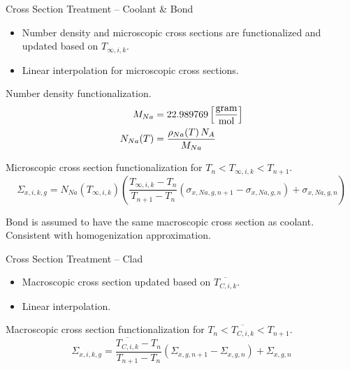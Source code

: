 \begin{frame}{Cross Section Treatment -- Coolant \& Bond}
  \begin{itemize}
    \item Number density and microscopic cross sections are functionalized 
      and updated based on $T_{\infty,i,k}$.
    \item Linear interpolation for microscopic cross sections.
  \end{itemize}

  Number density functionalization.
  \begin{align}
    \label{eq:number_density_sodium}
    M_{Na} &= 22.989769 \left[\text{{$\frac{\text{gram}}{\text{mol}}$}}\right] \\
    N_{Na}(T) &= \frac{\rho_{Na}(T) \, N_A}{M_{Na}}
  \end{align}

  Microscopic cross section functionalization for ${T_{n} < T_{\infty,i,k} <
  T_{n+1}}$.
  \begin{equation}
    \label{eq:xs_cool}
    \Sigma_{x,i,k,g} = N_{Na}(T_{\infty,i,k}) 
      \left( \frac{T_{\infty,i,k} - T_{n}}{T_{n+1}-T_{n}} 
      (\sigma_{x,Na,g,n+1} - \sigma_{x,Na,g,n})  + \sigma_{x,Na,g,n}\right)
  \end{equation}

  Bond is assumed to have the same macroscopic cross section as coolant.\\
  Consistent with homogenization approximation.
\end{frame}

\begin{frame}{Cross Section Treatment -- Clad}
  \begin{itemize}
    \item Macroscopic cross section updated based on $\overline{T_{C,i,k}}$.
    \item Linear interpolation.
  \end{itemize}

  Macroscopic cross section functionalization for ${T_n < \overline{T_{C,i,k}} <
  T_{n+1}}$.
  \begin{equation}
    \label{eq:xs_linear_interpolation}
    \Sigma_{x,i,k,g} = 
      \frac{\overline{T_{C,i,k}} - T_{n}}{T_{n+1}-T_{n}} 
      (\Sigma_{x,g,n+1} - \Sigma_{x,g,n})  + \Sigma_{x,g,n}
  \end{equation}
\end{frame}

